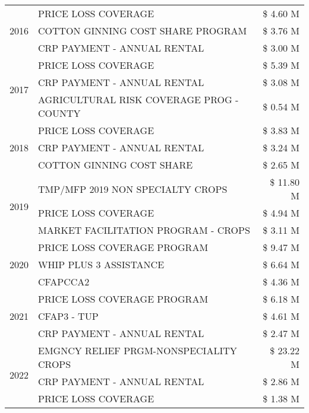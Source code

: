 \begin{tabular}{llr}
\cline{1-3}
\multirow[t]{3}{*}{2016} & PRICE LOSS COVERAGE & \$ 4.60 M \\
 & COTTON GINNING COST SHARE PROGRAM & \$ 3.76 M \\
 & CRP PAYMENT - ANNUAL RENTAL & \$ 3.00 M \\
\cline{1-3}
\multirow[t]{3}{*}{2017} & PRICE LOSS COVERAGE & \$ 5.39 M \\
 & CRP PAYMENT - ANNUAL RENTAL & \$ 3.08 M \\
 & AGRICULTURAL RISK COVERAGE PROG - COUNTY & \$ 0.54 M \\
\cline{1-3}
\multirow[t]{3}{*}{2018} & PRICE LOSS COVERAGE & \$ 3.83 M \\
 & CRP PAYMENT - ANNUAL RENTAL & \$ 3.24 M \\
 & COTTON GINNING COST SHARE & \$ 2.65 M \\
\cline{1-3}
\multirow[t]{3}{*}{2019} & TMP/MFP 2019 NON SPECIALTY CROPS & \$ 11.80 M \\
 & PRICE LOSS COVERAGE & \$ 4.94 M \\
 & MARKET FACILITATION PROGRAM - CROPS & \$ 3.11 M \\
\cline{1-3}
\multirow[t]{3}{*}{2020} & PRICE LOSS COVERAGE PROGRAM & \$ 9.47 M \\
 & WHIP PLUS 3 ASSISTANCE & \$ 6.64 M \\
 & CFAPCCA2 & \$ 4.36 M \\
\cline{1-3}
\multirow[t]{3}{*}{2021} & PRICE LOSS COVERAGE PROGRAM & \$ 6.18 M \\
 & CFAP3 - TUP & \$ 4.61 M \\
 & CRP PAYMENT - ANNUAL RENTAL & \$ 2.47 M \\
\cline{1-3}
\multirow[t]{3}{*}{2022} & EMGNCY RELIEF PRGM-NONSPECIALITY CROPS & \$ 23.22 M \\
 & CRP PAYMENT - ANNUAL RENTAL & \$ 2.86 M \\
 & PRICE LOSS COVERAGE & \$ 1.38 M \\
\cline{1-3}
\bottomrule
\end{tabular}
